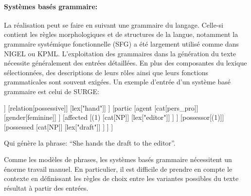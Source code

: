 	\paragraph{Systèmes basés grammaire:} La réalisation peut se faire en suivant une grammaire du langage. Celle-si contient les règles morphologiques et de structures de la langue, notamment la grammaire systémique fonctionnelle (SFG)\cite{Halliday2004} a été largement utilisé comme dans NIGEL\cite{Mann1983} ou KPML\cite{Bateman1997}. L’exploitation des grammaires dans la génération du texte nécessite généralement des entrées détaillées. En plus des composantes du lexique sélectionnées, des descriptions de leurs rôles ainsi que leurs fonctions grammaticales sont souvent exigées. Un exemple d’entrée d’un système basé grammaire est celui de SURGE\cite{Elhadad1996}:
	\begin{center}
		\begin{forest} [
			[cat:clause]
			[process
			[type[composite]]
			[relation[possessive]]
			[lex[\color{red}"hand"]]
			]
			[partic
			[agent
			[cat[pers\_pro]]
			[gender[feminine]]
			]
			[affected
			[(1)
			[cat[NP]]
			[lex[\color{red}"editor"]]
			]
			]
			[possessor[(1)]]
			[possessed
			[cat[NP]]
			[lex[\color{red}"draft"]]
			]
			]
			]
		\end{forest}
	\end{center}
	Qui génère la phrase: “She hands the draft to the editor”.\newline

Comme les modèles de phrases, les systèmes basés grammaire nécessitent un énorme travail manuel. En particulier, il est difficile de prendre en compte le contexte en définissant les règles de choix entre les variantes possibles du texte résultat à partir des entrées\cite{Gatt2018}.

